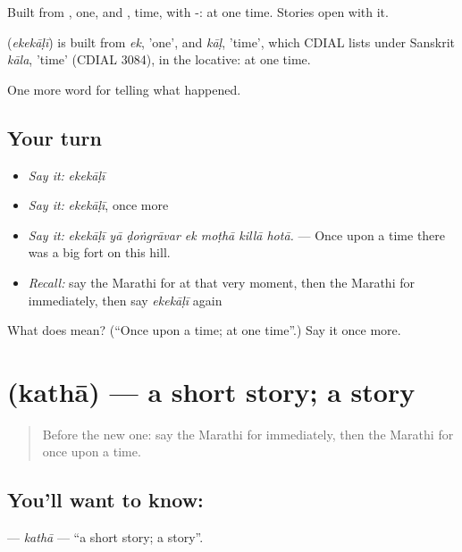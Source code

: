 Built from , one, and , time, with -: at one time. Stories open with it.

\begin{cousinweb}
\textbf{} (\emph{ekekāḷī}) is built from \emph{ek}, 'one', and \emph{kāḷ}, 'time', which CDIAL lists under Sanskrit \emph{kāla}, 'time' (CDIAL 3084), in the locative: at one time.
\end{cousinweb}

\begin{grammarlens}[title={What you've built}]
One more word for telling what happened.
\end{grammarlens}

\subsection*{Your turn}
\begin{itemize}
\raggedright
  \item \emph{Say it:} \emph{ekekāḷī}
  \item \emph{Say it:} \emph{ekekāḷī}, once more
  \item \emph{Say it:} \emph{ekekāḷī yā ḍoṅgrāvar ek moṭhā killā hotā.} — Once upon a time there was a big fort on this hill.
  \item \emph{Recall:} say the Marathi for at that very moment, then the Marathi for immediately, then say \emph{ekekāḷī} again
\end{itemize}

\begin{tcolorbox}[breakable,colback=teal!4,colframe=teal!35!black,title={Before you move on}]
What does  mean? (\textquotedblleft{}Once upon a time; at one time\textquotedblright{}.) Say it once more.
\end{tcolorbox}
\section[\texorpdfstring{\mr{कथा} (kathā)}{कथा (kathā)}]{ (kathā) — a short story; a story}

\label{lesson:MR-C303-katha}



\begin{quote}
Before the new one: say the Marathi for immediately, then the Marathi for once upon a time.
\end{quote}

\subsection*{You'll want to know: }
\textbf{} — \emph{kathā} — \textquotedblleft{}a short story; a story\textquotedblright{}.

